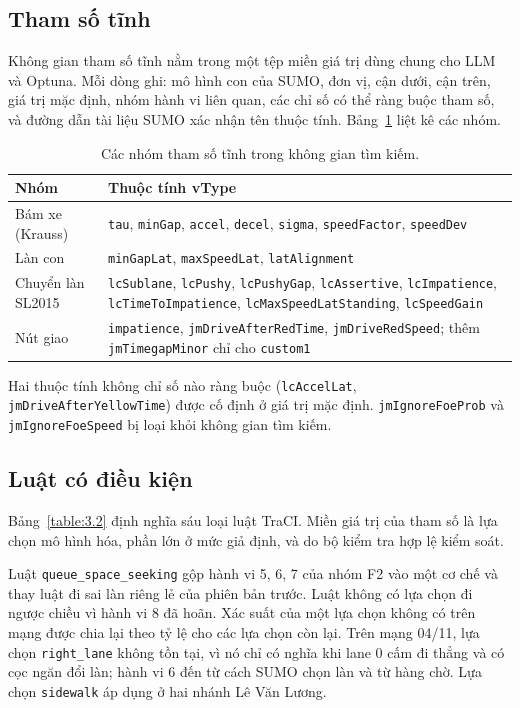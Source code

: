 \documentclass[../main.tex]{subfiles}
\begin{document}
\subsection{Tham số tĩnh}

Không gian tham số tĩnh nằm trong một tệp miền giá trị dùng chung cho LLM và Optuna. Mỗi dòng ghi: mô hình con của SUMO, đơn vị, cận dưới, cận trên, giá trị mặc định, nhóm hành vi liên quan, các chỉ số có thể ràng buộc tham số, và đường dẫn tài liệu SUMO xác nhận tên thuộc tính. Bảng~\ref{table:3.1b} liệt kê các nhóm.

\begin{table}[ht]
\centering
\small
\caption{Các nhóm tham số tĩnh trong không gian tìm kiếm.}
\label{table:3.1b}
\begin{tabular}{|p{4.2cm}|p{9.8cm}|}
\hline
\textbf{Nhóm} & \textbf{Thuộc tính vType} \\
\hline
Bám xe (Krauss) & \texttt{tau}, \texttt{minGap}, \texttt{accel}, \texttt{decel}, \texttt{sigma}, \texttt{speedFactor}, \texttt{speedDev} \\
\hline
Làn con & \texttt{minGapLat}, \texttt{maxSpeedLat}, \texttt{latAlignment} \\
\hline
Chuyển làn SL2015 & \texttt{lcSublane}, \texttt{lcPushy}, \texttt{lcPushyGap}, \texttt{lcAssertive}, \texttt{lcImpatience}, \texttt{lcTimeToImpatience}, \texttt{lcMaxSpeedLatStanding}, \texttt{lcSpeedGain} \\
\hline
Nút giao & \texttt{impatience}, \texttt{jmDriveAfterRedTime}, \texttt{jmDriveRedSpeed}; thêm \texttt{jmTimegapMinor} chỉ cho \texttt{custom1} \\
\hline
\end{tabular}
\end{table}

Hai thuộc tính không chỉ số nào ràng buộc (\texttt{lcAccelLat}, \texttt{jmDriveAfterYellowTime}) được cố định ở giá trị mặc định. \texttt{jmIgnoreFoeProb} và \texttt{jmIgnoreFoeSpeed} bị loại khỏi không gian tìm kiếm.

\subsection{Luật có điều kiện}

Bảng~\ref{table:3.2} định nghĩa sáu loại luật TraCI. Miền giá trị của tham số là lựa chọn mô hình hóa, phần lớn ở mức giả định, và do bộ kiểm tra hợp lệ kiểm soát.

Luật \texttt{queue\_space\_seeking} gộp hành vi 5, 6, 7 của nhóm F2 vào một cơ chế và thay luật đi sai làn riêng lẻ của phiên bản trước. Luật không có lựa chọn đi ngược chiều vì hành vi 8 đã hoãn. Xác suất của một lựa chọn không có trên mạng được chia lại theo tỷ lệ cho các lựa chọn còn lại. Trên mạng 04/11, lựa chọn \texttt{right\_lane} không tồn tại, vì nó chỉ có nghĩa khi lane 0 cấm đi thẳng và có cọc ngăn đổi làn; hành vi 6 đến từ cách SUMO chọn làn và từ hàng chờ. Lựa chọn \texttt{sidewalk} áp dụng ở hai nhánh Lê Văn Lương.
\end{document}
